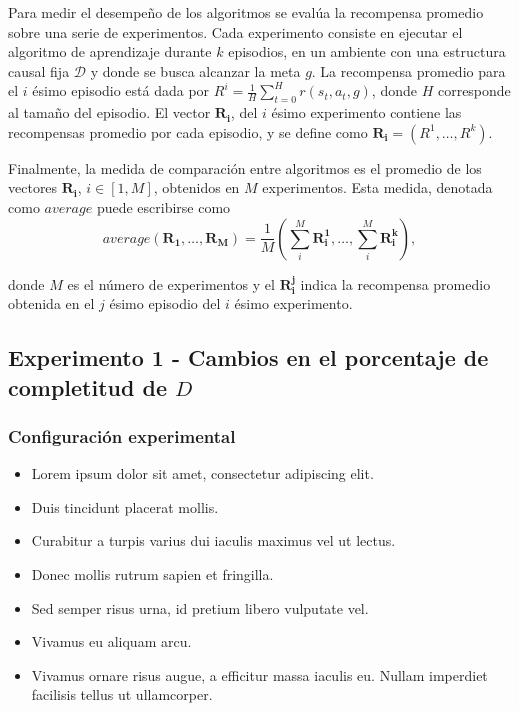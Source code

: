 Para medir el desempeño de los algoritmos se evalúa la recompensa
promedio sobre una serie de experimentos.
Cada experimento consiste en ejecutar el algoritmo de aprendizaje durante $k$ episodios, en 
un ambiente con una estructura causal fija $\mathcal{D}$ y donde se busca alcanzar la meta $g$.
La recompensa promedio para el $i$ ésimo episodio está dada por
$R^{i} = \frac{1}{H}\sum_{t=0}^H r(s_t, a_t, g)$,
donde $H$ corresponde al tamaño del episodio.
El vector $\mathbf{R_i}$, del $i$ ésimo experimento contiene las recompensas promedio por cada episodio, y se define como
$\mathbf{R_i} = (R^{1}, \dots, R^k)$.

Finalmente, la medida de comparación entre algoritmos es
el promedio de los vectores $\mathbf{R_i}$, $i\in [1, M]$,  obtenidos en $M$ experimentos. Esta medida, denotada como  $average$ puede escribirse como 
\begin{equation}
\label{eq:average}
average(\mathbf{R_1}, \dots, \mathbf{R_M}) = \frac{1}{M}(\sum^M_i \mathbf{R_{i}^1}, \dots, \sum^M_i\mathbf{R_{i}^k}),    
\end{equation}

donde $M$ es el número de experimentos y el $\mathbf{R_i^j}$ indica la recompensa promedio obtenida en el $j$ ésimo episodio del $i$ ésimo experimento.

\subsection{Experimento 1 - Cambios en el porcentaje de completitud de $D$}

\subsubsection{Configuración experimental}

\begin{itemize}
    \item  Lorem ipsum dolor sit amet, consectetur adipiscing elit. 
    \item Duis tincidunt placerat mollis. 
    \item Curabitur a turpis varius dui iaculis maximus vel ut lectus. 
    \item Donec mollis rutrum sapien et fringilla.
    \item Sed semper risus urna, id pretium libero vulputate vel. 
    \item Vivamus eu aliquam arcu. 
    \item Vivamus ornare risus augue, a efficitur massa iaculis eu. Nullam imperdiet facilisis tellus ut ullamcorper. 
\end{itemize}
